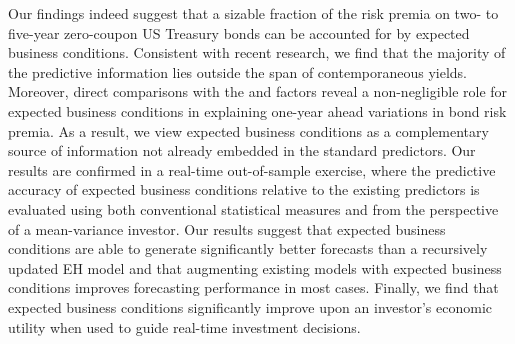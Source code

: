 \documentclass[12pt,letterpaper,leqno,doublespacing]{article}
\begin{document}
Our findings indeed suggest that a sizable fraction of the risk premia on two- to five-year zero-coupon US Treasury bonds can be accounted for by expected business conditions. Consistent with recent research, we find that the majority of the predictive information lies outside the span of contemporaneous yields. Moreover, direct comparisons with the \cite{CochranePiazzesi2005} and \cite{LudvigsonNg2009} factors reveal a non-negligible role for expected business conditions in explaining one-year ahead variations in bond risk premia. As a result, we view expected business conditions as a complementary source of information not already embedded in the standard predictors. Our results are confirmed in a real-time out-of-sample exercise, where the predictive accuracy of expected business conditions relative to the existing predictors is evaluated using both conventional statistical measures and from the perspective of a mean-variance investor. Our results suggest that expected business conditions are able to generate significantly better forecasts than a recursively updated EH model and that augmenting existing models with expected business conditions improves forecasting performance in most cases. Finally, we find that expected business conditions significantly improve upon an investor's economic utility when used to guide real-time investment decisions. 


\newpage

 

\end{document}
